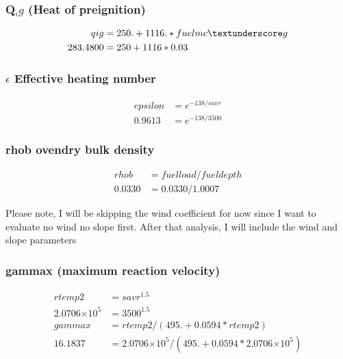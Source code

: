 \documentclass{article}
\newcommand\tenpow[1]{\ensuremath{{\times}10^{#1}}}
\begin{document}
\subsubsection*{Q$_ig$ (Heat of preignition)}
\begin{equation}
	\begin{split}
		qig &= 250. + 1116.*fuelmc \textunderscore g \\
		283.4800 &= 250 + 1116 * 0.03
	\end{split}
\end{equation}

\subsubsection*{$\epsilon$ Effective heating number}

\begin{equation}
	\begin{split}
		epsilon &= e ^ {-138 / savr} \\
		0.9613 &= e ^ {-138 / 3500} 
	\end{split}
\end{equation}

\subsubsection*{rhob ovendry bulk density}
\begin{equation}
	\begin{split}
		rhob &= fuelload/fueldepth \\
		0.0330 &= 0.0330 / 1.0007
	\end{split}
\end{equation}

Please note, I will be skipping the wind coefficient for now since I want to evaluate no wind no slope first. After that analysis, I will include the wind and slope parameters
\subsubsection*{gammax (maximum reaction velocity)}
\begin{equation}
	\begin{split}
		rtemp2 &= savr ^ {1.5} \\
		2.0706 \tenpow{5} &= 3500 ^ {1.5} \\
		gammax   &= rtemp2/(495. + 0.0594*rtemp2) \\
		16.1837 &= 2.0706 \tenpow{5} / (495. + 0.0594* 2.0706 \tenpow{5})
	\end{split}
\end{equation}
\end{document}
